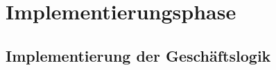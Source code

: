 \section{Implementierungsphase} 
\label{sec:Implementierungsphase}

\subsection{Implementierung der Geschäftslogik}
\label{sec:ImplementierungGeschaeftslogik}
%
%









